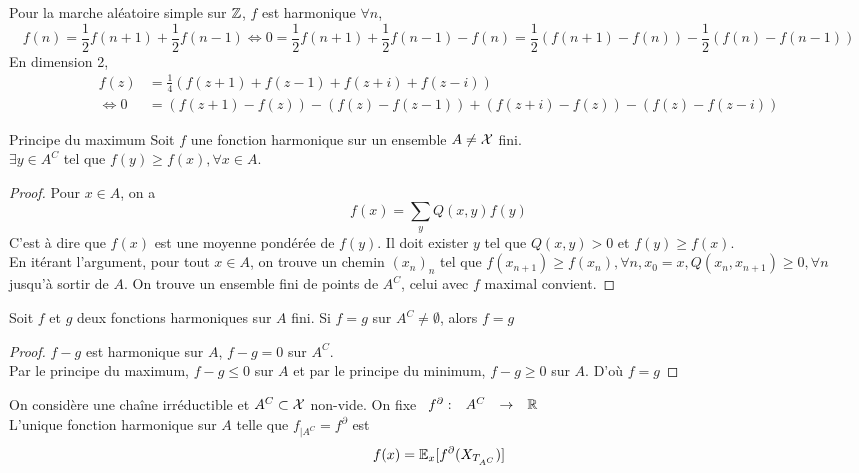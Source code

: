 \documentclass[]{report}
\begin{document}
    \begin{ex}{}{}
        Pour la marche aléatoire simple sur $\mathbb{Z}$, $f$ est harmonique \ssi $\forall n$,
        \[f(n)=\frac{1}{2}f(n+1)+\frac{1}{2}f(n-1) \iff 0=\frac{1}{2}f(n+1)+\frac{1}{2}f(n-1)-f(n)=\frac{1}{2}(f(n+1)-f(n))-\frac{1}{2}(f(n)-f(n-1))\]
        En dimension 2,
        \begin{align*}
            f(z)&=\frac{1}{4}(f(z+1)+f(z-1)+f(z+i)+f(z-i))\\
            \iff 0&=(f(z+1)-f(z))-(f(z)-f(z-1))+(f(z+i)-f(z))-(f(z)-f(z-i))
        \end{align*}
    \end{ex}

    \begin{prop}{Principe du maximum}{}
        Soit $f$ une fonction harmonique sur un ensemble $A\neq \mathcal{X}$ fini.\\
        $\exists y\in A^C$ tel que $f(y)\ge f(x),\forall x\in A$.
    \end{prop}

    \begin{proof}
        Pour $x\in A$, on a
        \[f(x)=\sum_y Q(x,y) f(y)\]
        C'est à dire que $f(x)$ est une moyenne pondérée de $f(y)$. Il doit exister $y$ tel que $Q(x,y)>0$ et $f(y)\ge f(x)$.\\
        En itérant l'argument, pour tout $x\in A$, on trouve un chemin $(x_n)_n$ tel que $f(x_{n+1})\ge f(x_n),\forall n,x_0=x,Q(x_n,x_{n+1})\ge 0,\forall n$ jusqu'à sortir de $A$. On trouve un ensemble fini de points de $A^C$, celui avec $f$ maximal convient.
    \end{proof}

    \begin{cor}{}{}
        Soit $f$ et $g$ deux fonctions harmoniques sur $A$ fini. Si $f=g$ sur $A^C\neq \emptyset$, alors $f=g$
    \end{cor}

    \begin{proof}
        $f-g$ est harmonique sur $A$, $f-g=0$ sur $A^C$.\\
        Par le principe du maximum, $f-g\le 0$ sur $A$ et par le principe du minimum, $f-g\ge 0$ sur $A$. D'où $f=g$
    \end{proof}

    \begin{prop}{}{}
        On considère une chaîne irréductible et $A^C\subset \mathcal{X}$ non-vide. On fixe $\begin{array}{ccccc} f^\partial : & A^C & \to & \mathbb{R} \end{array}$\\
        L'unique fonction harmonique sur $A$ telle que $f_{|A^C}=f^\partial$ est
        \[f(x)=\mathbb{E}_x[f^\partial(X_{T_{A^C}})]\]
    \end{prop}
\end{document}
